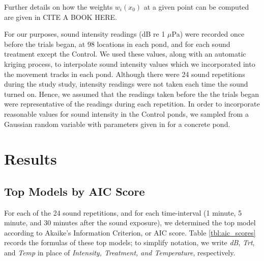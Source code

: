\documentclass[12pt]{article}
\begin{document}
			Further details on how the weights $w_i(x_0)$ at a given point can be computed are given in CITE A BOOK HERE.
			
			For our purposes, sound intensity readings (dB re 1 $\mu$Pa) were recorded once before the trials began, at 98 locations in each pond, and for each sound treatment except the Control. We used these values, along with an automatic kriging process, to interpolate sound intensity values which we incorporated into the movement tracks in each pond. Although there were 24 sound repetitions during the study study, intensity readings were not taken each time the sound turned on. Hence, we assumed that the readings taken before the the trials began were representative of the readings during each repetition. In order to incorporate reasonable values for sound intensity in the Control ponds, we sampled from a Gaussian random variable with parameters given in \cite{Wysocki2007} for a concrete pond.			

\section{Results}

	\subsection{Top Models by AIC Score}
		
		For each of the 24 sound repetitions, and for each time-interval (1 minute, 5 minute, and 30 minutes after the sound exposure), we determined the top model according to Akaike's Information Criterion, or AIC score. Table \ref{tbl:aic_scores} records the formulas of these top models; to simplify notation, we write \emph{dB}, \emph{Trt}, and \emph{Temp} in place of \emph{Intensity, Treatment, and Temperature}, respectively.
		
\end{document}
